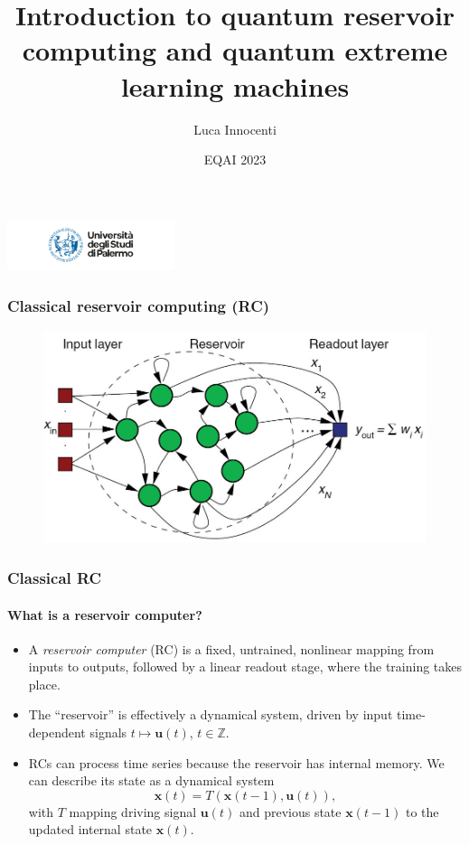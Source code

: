 \documentclass{beamer}
\title{Introduction to quantum reservoir computing and quantum extreme learning machines}
\author{Luca Innocenti}
\date{EQAI 2023}
\begin{document}
\begin{frame}
  \titlepage
  \hfill\includegraphics[height=1.5cm]{figures/logo-unipa-2020.png}
\end{frame}

\begin{frame}
\frametitle{Classical reservoir computing (RC)}

\begin{figure}
    \centering
    \includegraphics[width=\linewidth]{figures/scheme_RC.jpg}
\end{figure}

\end{frame}


\begin{frame}
  \frametitle{Classical RC}
  \framesubtitle{What is a reservoir computer?}
  
  \begin{itemize}
      \item A \textit{reservoir computer} (RC) is a fixed, untrained, nonlinear mapping from inputs to outputs, followed by a linear readout stage, where the training takes place.
      \item The ``reservoir'' is effectively a dynamical system, driven by input time-dependent signals $t\mapsto \mathbf u(t)$, $t\in\mathbb{Z}$.
      \item RCs can process time series because the reservoir has internal memory. We can describe its state as a dynamical system
      \begin{equation}
          \mathbf x(t)=T(\mathbf x(t-1),\mathbf u(t)),
      \end{equation}
      with $T$ mapping driving signal $\mathbf u(t)$ and previous state $\mathbf x(t-1)$ to the updated internal state $\mathbf x(t)$.
  \end{itemize}
\end{frame}
\end{document}
